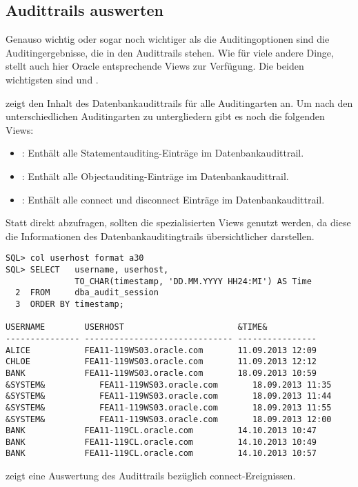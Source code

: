       \subsection{Audittrails auswerten}
        Genauso wichtig oder sogar noch wichtiger als die Auditingoptionen sind die Auditingergebnisse, die in den Audittrails stehen. Wie f\"ur viele andere Dinge, stellt auch hier Oracle entsprechende Views zur Verf\"ugung. Die beiden wichtigsten sind  und .

         zeigt den Inhalt des Datenbank\-audittrails f\"ur alle Auditingarten an. Um nach den unterschiedlichen Auditingarten zu untergliedern gibt es noch die folgenden Views:
        \begin{itemize}
          \item {}: Enth\"alt alle Statementauditing-Eintr\"age im Datenbank\-audit\-trail.
          \item {}: Enth\"alt alle Objectauditing-Eintr\"age im Datenbank\-audit\-trail.
          \item {}: Enth\"alt alle connect und disconnect Eintr\"age im Datenbank\-audit\-trail.
        \end{itemize}
\clearpage
        \begin{merke}
          Statt  direkt abzufragen, sollten die spezialisierten Views genutzt werden, da diese die Informationen des Datenbankauditingtrails \"ubersichtlicher darstellen.
        \end{merke}
        \begin{lstlisting}[caption={Den Datenbankauditingtrail nach connects auswerten},label=admin815,language=oracle_sql,alsolanguage=sqlplus]
SQL> col userhost format a30
SQL> SELECT   username, userhost,
              TO_CHAR(timestamp, 'DD.MM.YYYY HH24:MI') AS Time
  2  FROM     dba_audit_session
  3  ORDER BY timestamp;

USERNAME        USERHOST                       &TIME&
--------------- ------------------------------ ----------------
ALICE           FEA11-119WS03.oracle.com       11.09.2013 12:09
CHLOE           FEA11-119WS03.oracle.com       11.09.2013 12:12
BANK            FEA11-119WS03.oracle.com       18.09.2013 10:59
&SYSTEM&           FEA11-119WS03.oracle.com       18.09.2013 11:35
&SYSTEM&           FEA11-119WS03.oracle.com       18.09.2013 11:44
&SYSTEM&           FEA11-119WS03.oracle.com       18.09.2013 11:55
&SYSTEM&           FEA11-119WS03.oracle.com       18.09.2013 12:00
BANK            FEA11-119CL.oracle.com         14.10.2013 10:47
BANK            FEA11-119CL.oracle.com         14.10.2013 10:49
BANK            FEA11-119CL.oracle.com         14.10.2013 10:57
        \end{lstlisting}
         zeigt eine Auswertung des Audittrails bez\"uglich connect-Ereignissen.

